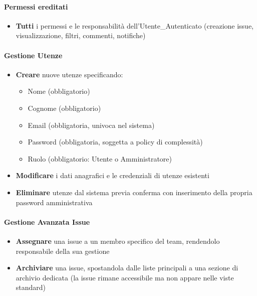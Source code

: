 \paragraph{Permessi ereditati}
\begin{itemize}[leftmargin=1.1em]
\item \textbf{Tutti} i permessi e le responsabilità dell'Utente\_Autenticato (creazione issue, visualizzazione, filtri, commenti, notifiche)
\end{itemize}

\newpage

\paragraph{Gestione Utenze}
\begin{itemize}[leftmargin=1.1em]
\item \textbf{Creare} nuove utenze specificando:
  \begin{itemize}
  \item Nome (obbligatorio)
  \item Cognome (obbligatorio)
  \item Email (obbligatoria, univoca nel sistema)
  \item Password (obbligatoria, soggetta a policy di complessità)
  \item Ruolo (obbligatorio: Utente o Amministratore)
  \end{itemize}
\item \textbf{Modificare} i dati anagrafici e le credenziali di utenze esistenti
\item \textbf{Eliminare} utenze dal sistema previa conferma con inserimento della propria password amministrativa
\end{itemize}

\paragraph{Gestione Avanzata Issue}
\begin{itemize}[leftmargin=1.1em]
\item \textbf{Assegnare} una issue a un membro specifico del team, rendendolo responsabile della sua gestione
\item \textbf{Archiviare} una issue, spostandola dalle liste principali a una sezione di archivio dedicata (la issue rimane accessibile ma non appare nelle viste standard)
\end{itemize}

